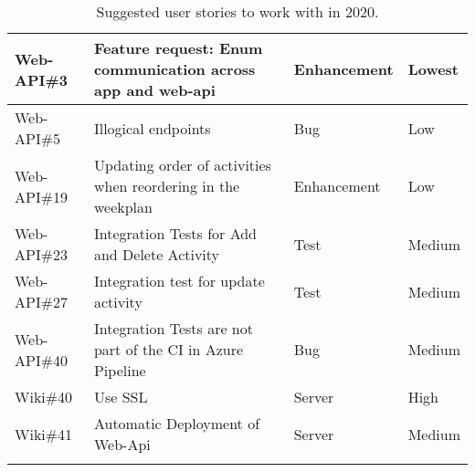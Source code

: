 \begin{longtable}{|p{2.9cm}|p{7cm}|p{1.4cm}|p{1.5cm}|}
    Web-API\#3       & Feature request: Enum communication across app and web-api                                                                                                                & Enhancement & Lowest  \\ \hline
    Web-API\#5       & Illogical endpoints                                                                                                                                                       & Bug & Low  \\ \hline
    Web-API\#19      & Updating order of activities when reordering in the weekplan                                                                                                              & Enhancement & Low  \\ \hline
    Web-API\#23      & Integration Tests for Add and Delete Activity                                                                                                                             & Test & Medium  \\ \hline
    Web-API\#27      & Integration test for update activity                                                                                                                                      & Test & Medium  \\ \hline
    Web-API\#40      & Integration Tests are not part of the CI in Azure Pipeline                                                                                                                & Bug & Medium   \\ \hline
    Wiki\#40         & Use SSL                                                                                                                                                                   & Server     & High  \\ \hline
    Wiki\#41         & Automatic Deployment of Web-Api                                                                                                                                           & Server     & Medium     \\ \hline  
    \caption{Suggested user stories to work with in 2020.}
\end{longtable}
